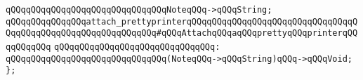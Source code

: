 \verb|qQQqqQQqqQQqqQQqqQQqqQQqqQQqqQQqNoteqQQq->qQQqString;|\newline
\newline
\newline
\newline
\verb|qQQqqQQqqQQqqQQqattach_prettyprinterqQQqqQQqqQQqqQQqqQQqqQQqqQQqqQQqqQQqqQQqqQQqqQQqqQQqqQQqqQQqqQQq#qQQqAttachqQQqaqQQqprettyqQQqprinterqQQqqQQqqQQq|\newline
\verb|qQQqqQQqqQQqqQQqqQQqqQQqqQQqqQQq:|\newline
\verb|qQQqqQQqqQQqqQQqqQQqqQQqqQQqqQQq(NoteqQQq->qQQqString)qQQq->qQQqVoid;|\newline
\newline
\verb|};|\newline

